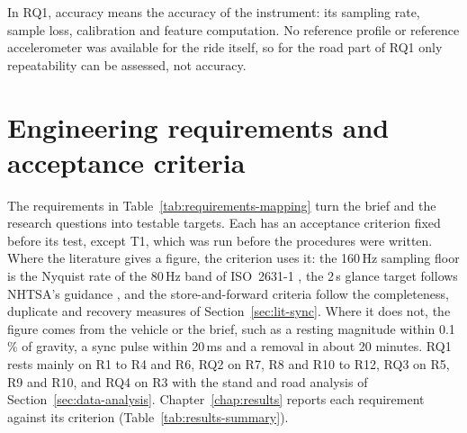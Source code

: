 In RQ1, accuracy means the accuracy of the instrument: its sampling rate, sample loss, calibration and feature computation. No reference profile or reference accelerometer was available for the ride itself, so for the road part of RQ1 only repeatability can be assessed, not accuracy.

\section{Engineering requirements and acceptance criteria}
\label{sec:requirements-mapping}

The requirements in Table~\ref{tab:requirements-mapping} turn the brief and the research questions into testable targets. Each has an acceptance criterion fixed before its test, except T1, which was run before the procedures were written. Where the literature gives a figure, the criterion uses it: the 160\,Hz sampling floor is the Nyquist rate of the 80\,Hz band of ISO~2631-1 \cite{iso2631}, the 2\,s glance target follows NHTSA's guidance \cite{nhtsa2013}, and the store-and-forward criteria follow the completeness, duplicate and recovery measures of Section~\ref{sec:lit-sync}. Where it does not, the figure comes from the vehicle or the brief, such as a resting magnitude within 0.1\,\% of gravity, a sync pulse within 20\,ms and a removal in about 20 minutes. RQ1 rests mainly on R1 to R4 and R6, RQ2 on R7, R8 and R10 to R12, RQ3 on R5, R9 and R10, and RQ4 on R3 with the stand and road analysis of Section~\ref{sec:data-analysis}. Chapter~\ref{chap:results} reports each requirement against its criterion (Table~\ref{tab:results-summary}).

